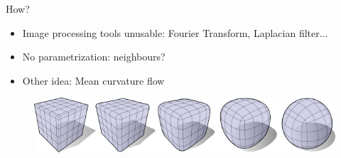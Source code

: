 \documentclass{beamer}
\begin{document}
\begin{frame}[allowframebreaks]
    \newpage
    How?
    \begin{itemize}
        \item Image processing tools unusable: Fourier Transform, Laplacian
            filter...
        \item No parametrization: neighbours?
        \item Other idea: Mean curvature flow
    \end{itemize}

    \begin{figure}
        \centering
        \includegraphics[scale=0.3]{img/mean-curvature-flow-cube}
    \end{figure}
\end{frame}
\end{document}
